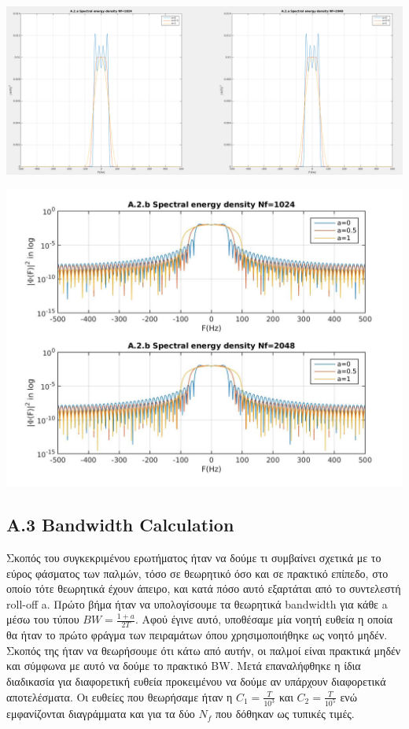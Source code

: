 \documentclass[11pt]{article}
\begin{document}
    
    \begin{center}
        \includegraphics[scale=0.22]{photos/A.2 FourierTransformPlots_alt.png}
    \end{center} 
    
    \begin{center}
        \includegraphics[scale=0.4]{photos/A.2 FourierTransformSemilogy.jpg}
    \end{center} 
    
    
    \subsection*{Α.3 Bandwidth Calculation}
    Σκοπός του συγκεκριμένου ερωτήματος ήταν να δούμε τι συμβαίνει σχετικά με το εύρος φάσματος των παλμών, τόσο σε θεωρητικό όσο και σε πρακτικό επίπεδο, στο οποίο τότε θεωρητικά έχουν άπειρο, και κατά πόσο αυτό εξαρτάται από το συντελεστή roll-off a. Πρώτο βήμα ήταν να υπολογίσουμε τα θεωρητικά bandwidth για κάθε a μέσω του τύπου $BW = \frac{1+a}{2T}$. Αφού έγινε αυτό, υποθέσαμε μία νοητή ευθεία η οποία θα ήταν το πρώτο φράγμα των πειραμάτων όπου χρησιμοποιήθηκε ως νοητό μηδέν. Σκοπός της ήταν να θεωρήσουμε ότι κάτω από αυτήν, οι παλμοί είναι πρακτικά μηδέν και σύμφωνα με αυτό να δούμε το πρακτικό BW. Μετά επαναλήφθηκε η ίδια διαδικασία για διαφορετική ευθεία προκειμένου να δούμε αν υπάρχουν διαφορετικά αποτελέσματα. Οι ευθείες που θεωρήσαμε ήταν η $C_1 = \frac{T}{10^3}$ και $C_2=\frac{T}{10^5}$ ενώ εμφανίζονται διαγράμματα και για τα δύο $N_f$ που δόθηκαν ως τυπικές τιμές.
\end{document}
